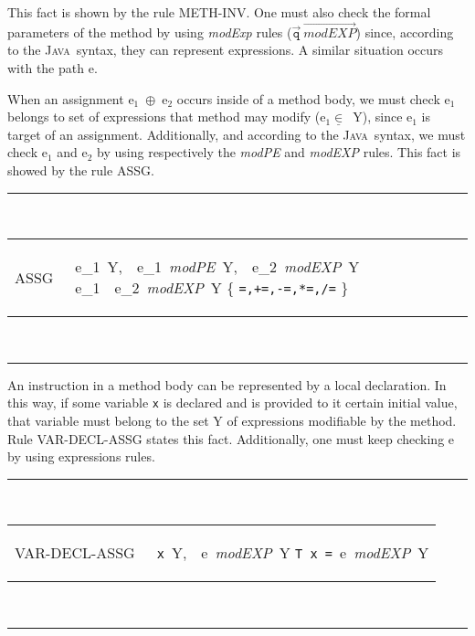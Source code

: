 \documentclass[a4paper]{llncs}
\newcommand{\java}{\textsc{Java}}
\begin{document}
This fact is shown by the rule
\textup{METH-INV}.  One must also check the formal parameters
of the method by using \emph{modExp} rules
($\overrightarrow{\texttt{q}}\ \overrightarrow{\textit{modEXP}}$) since,
according to the \java~syntax, they can represent expressions. A similar
situation occurs with the path \textup{e}.

When an assignment \textup{e}$_1$\ $\oplus$\
\textup{e}$_2$ occurs inside of a method body, we must check
\textup{e}$_1$ belongs to set of expressions that method may modify
(\textup{e}$_1\underline{\in}$\ \textsc{Y}), since \textup{e}$_1$ is
target of an assignment. Additionally, and according to the
\java~syntax, we must check \textup{e}$_1$ and \textup{e}$_2$ by
using respectively the \textit{modPE} and \textit{modEXP} rules. This
fact is showed by the rule \textup{ASSG}.
\begin{table}[hbt] %
\rule{\linewidth}{0.25mm}
\\[0.5ex]
\begin{tabular}{ll}
ASSG\,\,\, & 
\begin{prooftree}
\textup{e}_1\underline{\in}\ \textsc{Y},\ \ \textup{e}_1\
\textit{modPE}\ \textsc{Y},\ \ \textup{e}_2\ \textit{modEXP}\
\textsc{Y}
\justifies
\textup{e}_1\ \oplus\ \textup{e}_2\ \textit{modEXP}\ \textsc{Y}
\using
\oplus \in \{ \texttt{=,+=,-=,*=,/=} \}
\end{prooftree}
\end{tabular}
\\[0.5ex]
\rule{\linewidth}{0.25mm}
\end{table} %

An instruction in a method body can be represented by a local
declaration. In this way, if some variable \texttt{x} is declared and is
provided to it certain initial value, that variable must belong to the
set \textsc{Y} of expressions modifiable by the method. Rule
\textup{VAR-DECL-ASSG} states this fact. Additionally, one must
keep checking \textup{e} by using expressions rules.
\begin{table}[hbt] %
\rule{\linewidth}{0.25mm}
\\[0.5ex]
\begin{tabular}{ll}
VAR-DECL-ASSG\,\,\, & 
\begin{prooftree}
\rule[1ex]{0em}{1.5ex}
\texttt{x}\underline{\in}\ \textsc{Y},\ \ \textup{e}\ \textit{modEXP}\ \textsc{Y}
\justifies
\texttt{T x =}\ \textup{e}\ \textit{modEXP}\ \textsc{Y}
\end{prooftree}
\end{tabular}
\\[0.5ex]
\rule{\linewidth}{0.25mm}
\end{table} %
\end{document}
